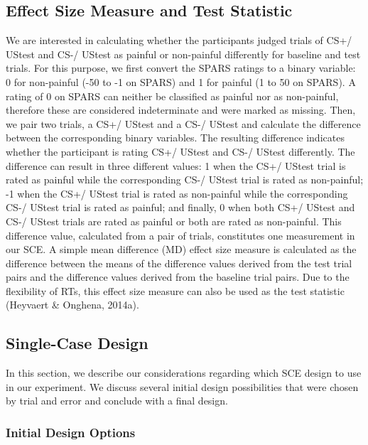 \documentclass{article}
\begin{document}
\subsection{Effect Size Measure and Test Statistic}

We are interested in calculating whether the participants judged trials of CS+/ UStest and CS-/ UStest as painful or non-painful differently for baseline and test trials. For this purpose, we first convert the SPARS ratings to a binary variable: 0 for non-painful (-50 to -1 on SPARS) and 1 for painful (1 to 50 on SPARS). A rating of 0 on SPARS can neither be classified as painful nor as non-painful, therefore these are considered indeterminate and were marked as missing. Then, we pair two trials, a CS+/ UStest and a CS-/ UStest and calculate the difference between the corresponding binary variables. The resulting difference indicates whether the participant is rating CS+/ UStest and CS-/ UStest differently. The difference can result in three different values: 1 when the CS+/ UStest trial is rated as painful while the corresponding CS-/ UStest trial is rated as non-painful; -1 when the CS+/ UStest trial is rated as non-painful while the corresponding CS-/ UStest trial is rated as painful; and finally, 0 when both CS+/ UStest and CS-/ UStest trials are rated as painful or both are rated as non-painful. This difference value, calculated from a pair of trials, constitutes one measurement in our SCE. A simple mean difference (MD) effect size measure is calculated as the difference between the means of the difference values derived from the test trial pairs and the difference values derived from the baseline trial pairs. Due to the flexibility of RTs, this effect size measure can also be used as the test statistic (Heyvaert \& Onghena, 2014a). 

\subsection{Single-Case Design }

In this section, we describe our considerations regarding which SCE design to use in our experiment. We discuss several initial design possibilities that were chosen by trial and error and conclude with a final design.

\subsubsection{Initial Design Options}
\end{document}
